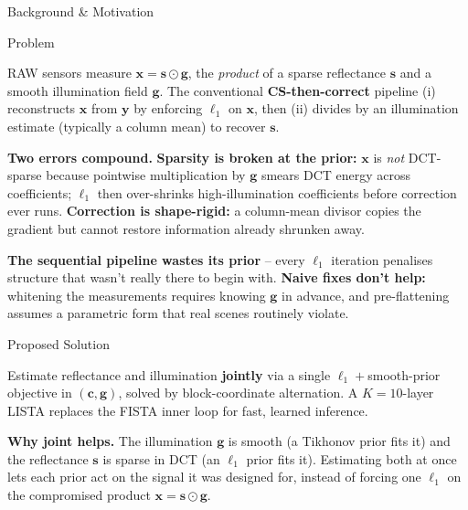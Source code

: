 \documentclass[final]{beamer}
\newlength{\colwidth}
\begin{document}
\begin{frame}[t]
\begin{columns}[t]
\begin{column}{\colwidth}
\begin{block}{Background \& Motivation}
      \end{block}

      \vspace{1ex}

      \begin{block}{Problem}

        RAW sensors measure
        $\boldsymbol{x}=\boldsymbol{s}\odot\boldsymbol{g}$, the
        \emph{product} of a sparse reflectance $\boldsymbol{s}$ and a
        smooth illumination field $\boldsymbol{g}$. The conventional
        \textbf{CS-then-correct} pipeline (i) reconstructs
        $\boldsymbol{x}$ from $\boldsymbol{y}$ by enforcing $\ell_1$
        on $\boldsymbol{x}$, then (ii) divides by an illumination
        estimate (typically a column mean) to recover $\boldsymbol{s}$.

        \medskip
        \textbf{Two errors compound.}
        \textbf{Sparsity is broken at the prior:} $\boldsymbol{x}$ is
        \emph{not} DCT-sparse because pointwise multiplication by
        $\boldsymbol{g}$ smears DCT energy across coefficients;
        $\ell_1$ then over-shrinks high-illumination coefficients
        before correction ever runs. \textbf{Correction is
        shape-rigid:} a column-mean divisor copies the gradient but
        cannot restore information already shrunken away.

        \medskip
        \textbf{The sequential pipeline wastes its prior} -- every
        $\ell_1$ iteration penalises structure that wasn't really
        there to begin with. \textbf{Naive fixes don't help:}
        whitening the measurements requires knowing $\boldsymbol{g}$
        in advance, and pre-flattening assumes a parametric form
        that real scenes routinely violate.

      \end{block}

      \vspace{1ex}

      \begin{alertblock}{Proposed Solution}

        Estimate reflectance and illumination \textbf{jointly} via a
        single $\ell_1{+}$smooth-prior objective in
        $(\boldsymbol{c},\boldsymbol{g})$, solved by block-coordinate
        alternation. A $K{=}10$-layer LISTA replaces the FISTA inner
        loop for fast, learned inference.

        \medskip
        \textbf{Why joint helps.} The illumination $\boldsymbol{g}$
        is smooth (a Tikhonov prior fits it) and the reflectance
        $\boldsymbol{s}$ is sparse in DCT (an $\ell_1$ prior fits
        it). Estimating both at once lets each prior act on the
        signal it was designed for, instead of forcing one $\ell_1$
        on the compromised product $\boldsymbol{x}{=}\boldsymbol{s}\odot\boldsymbol{g}$.


\end{alertblock}
\end{column}
\end{columns}
\end{frame}
\end{document}

